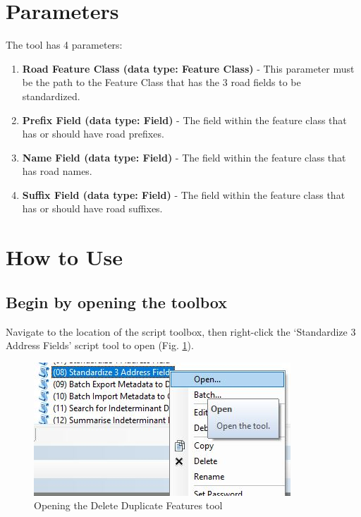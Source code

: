 \documentclass[openany]{book}
\theoremstyle{definition}
\theoremstyle{definition}
\theoremstyle{definition}
\theoremstyle{remark}
\begin{document}
\section{Parameters}\label{parameters-7}

The tool has 4 parameters:

\begin{enumerate}
\def\labelenumi{\arabic{enumi}.}
\item
  \textbf{Road Feature Class (data type: Feature Class)} - This
  parameter must be the path to the Feature Class that has the 3 road
  fields to be standardized.
\item
  \textbf{Prefix Field (data type: Field)} - The field within the
  feature class that has or should have road prefixes.
\item
  \textbf{Name Field (data type: Field)} - The field within the feature
  class that has road names.
\item
  \textbf{Suffix Field (data type: Field)} - The field within the
  feature class that has or should have road suffixes.
\end{enumerate}

\section{How to Use}\label{how-to-use-7}

\subsection{Begin by opening the
toolbox}\label{begin-by-opening-the-toolbox-7}

Navigate to the location of the script toolbox, then right-click the
`Standardize 3 Address Fields' script tool to open (Fig.
\ref{fig:std3open}).

\begin{figure}[H]

{\centering \includegraphics{figures/std3-open} 

}

\caption{Opening the Delete Duplicate Features tool}\label{fig:std3open}
\end{figure}
\end{document}

